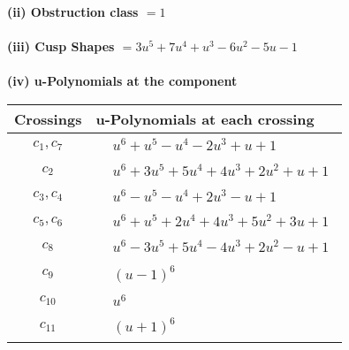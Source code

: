 \documentclass[1p]{elsarticle_modified}
\theoremstyle{definition}
\begin{document}
\flushleft \textbf{(ii) Obstruction class $= 1$}\\~\\
\flushleft \textbf{(iii) Cusp Shapes $= 3 u^5+7 u^4+u^3-6 u^2-5 u-1$}\\~\\
\newpage\renewcommand{\arraystretch}{1}
\flushleft \textbf{(iv) u-Polynomials at the component}\newline \\
\begin{tabular}{m{50pt}|m{274pt}}
Crossings & \hspace{64pt}u-Polynomials at each crossing \\
\hline $$\begin{aligned}c_{1},c_{7}\end{aligned}$$&$\begin{aligned}
&u^6+u^5- u^4-2 u^3+u+1
\end{aligned}$\\
\hline $$\begin{aligned}c_{2}\end{aligned}$$&$\begin{aligned}
&u^6+3 u^5+5 u^4+4 u^3+2 u^2+u+1
\end{aligned}$\\
\hline $$\begin{aligned}c_{3},c_{4}\end{aligned}$$&$\begin{aligned}
&u^6- u^5- u^4+2 u^3- u+1
\end{aligned}$\\
\hline $$\begin{aligned}c_{5},c_{6}\end{aligned}$$&$\begin{aligned}
&u^6+u^5+2 u^4+4 u^3+5 u^2+3 u+1
\end{aligned}$\\
\hline $$\begin{aligned}c_{8}\end{aligned}$$&$\begin{aligned}
&u^6-3 u^5+5 u^4-4 u^3+2 u^2- u+1
\end{aligned}$\\
\hline $$\begin{aligned}c_{9}\end{aligned}$$&$\begin{aligned}
&(u-1)^6
\end{aligned}$\\
\hline $$\begin{aligned}c_{10}\end{aligned}$$&$\begin{aligned}
&u^6
\end{aligned}$\\
\hline $$\begin{aligned}c_{11}\end{aligned}$$&$\begin{aligned}
&(u+1)^6
\end{aligned}$\\
\hline
\end{tabular}\\~\\
\end{document}
